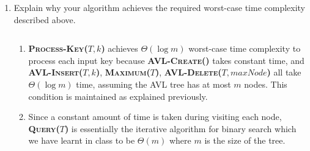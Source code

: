 \documentclass[11pt]{article}
\begin{document}
\begin{enumerate}
  \item Explain why your algorithm achieves the required worst-case time complexity described above.

  \begin{solution}$ $\\

      \begin{enumerate}
        \item \textbf{\textsc{Process-Key($T,k$)}} achieves $\Theta(\log m)$ worst-case time complexity to process each input key because \textbf{\textsc{AVL-Create}()} takes constant time, and \textbf{\textsc{AVL-Insert}($T,k$)}, \textbf{\textsc{Maximum}($T$)}, \textbf{\textsc{AVL-Delete}($T, maxNode$)} all take $\Theta(\log m)$ time, assuming the AVL tree has at most $m$ nodes. This condition is maintained as explained previously.
        \item  Since a constant amount of time is taken during visiting each node, \textbf{\textsc{Query}($T$)} is essentially the iterative algorithm for binary search which we have learnt in class to be $\Theta(m)$ where $m$ is the size of the tree.
      \end{enumerate}

  \end{solution}

\end{enumerate}
\end{document}
